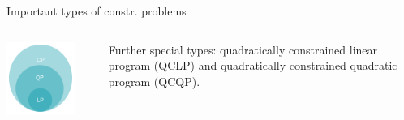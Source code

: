 \documentclass[11pt,compress,t,notes=noshow, xcolor=table]{beamer}
\begin{document}
\begin{vbframe}{Important types of constr. problems}



\framebreak 

\begin{columns}[T] %
	\begin{column}{.58\textwidth}
		\begin{center}
			\includegraphics[width=0.8\textwidth]{figure_man/classes_optimization_problems.png} 
		\end{center}
	\end{column}
	\begin{column}{.38\textwidth} \vspace*{1.5cm}
		Further special types: quadratically constrained linear program (QCLP) and quadratically constrained quadratic program (QCQP). 
	\end{column}
\end{columns}



\end{vbframe}
\end{document}
